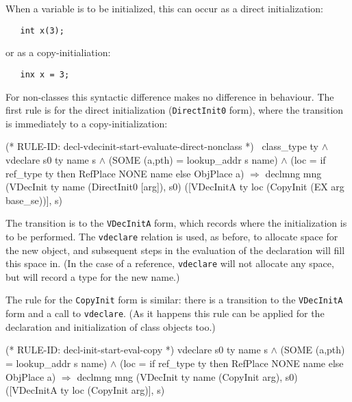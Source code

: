 \documentclass[11pt]{article}
\begin{document}
When a variable is to be initialized, this can occur as a direct
initialization:
\begin{verbatim}
   int x(3);
\end{verbatim}
or as a copy-initialiation:
\begin{verbatim}
   inx x = 3;
\end{verbatim}
%
For non-classes this syntactic difference makes no difference in
behaviour.  The first rule is for the direct initialization
(\texttt{DirectInit0} form), where the transition is immediately to a
copy-initialization:%
%
%
\begin{stdrule}
(* RULE-ID: decl-vdecinit-start-evaluate-direct-nonclass *)
     ~class_type ty \(\land\)
     vdeclare s0 ty name s \(\land\)
     (SOME (a,pth) = lookup_addr s name) \(\land\)
     (loc = if ref_type ty then RefPlace NONE name
            else ObjPlace a)
   \(\Rightarrow\)
     declmng mng
             (VDecInit ty name (DirectInit0 [arg]), s0)
             ([VDecInitA ty loc (CopyInit (EX arg base_se))], s)
\end{stdrule}
%
%
The transition is to the \texttt{VDecInitA} form, which records where
the initialization is to be performed.  The \texttt{vdeclare} relation
is used, as before, to allocate space for the new object, and
subsequent steps in the evaluation of the declaration will fill this
space in.  (In the case of a reference, \texttt{vdeclare} will not
allocate any space, but will record a type for the new name.)

%
The rule for the \texttt{CopyInit} form is similar: there is a
transition to the \texttt{VDecInitA} form and a call to
\texttt{vdeclare}. (As it happens this rule can be applied for the
declaration and initialization of class objects too.)%
%
\begin{stdrule}
(* RULE-ID: decl-init-start-eval-copy *)
     vdeclare s0 ty name s \(\land\)
     (SOME (a,pth) = lookup_addr s name) \(\land\)
     (loc = if ref_type ty then RefPlace NONE name
            else ObjPlace a)
   \(\Rightarrow\)
     declmng mng
             (VDecInit ty name (CopyInit arg), s0)
             ([VDecInitA ty loc (CopyInit arg)], s)
\end{stdrule}
\end{document}
